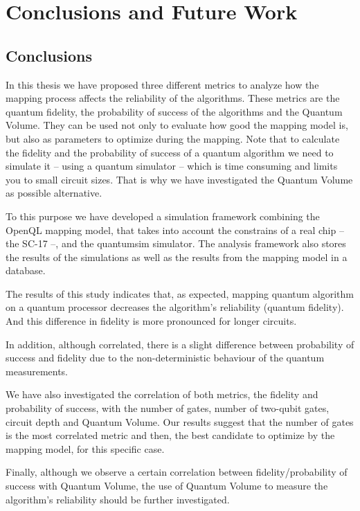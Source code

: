 

\chapter{Conclusions and Future Work}
\label{sec:org7d44186}
\section{Conclusions}
\label{sec:org16e6d2d}

In this thesis we have proposed three different metrics to analyze how the mapping process affects the reliability of the algorithms.
These metrics are the quantum fidelity, the probability of success of the algorithms and the Quantum Volume.
They can be used not only to evaluate how good the mapping model is, but also as parameters to optimize during the mapping.
Note that to calculate the fidelity and the probability of success of a quantum algorithm we need to simulate it -- using a quantum simulator -- which is time consuming and limits you to small circuit sizes.
That is why we have investigated the Quantum Volume as possible alternative.

To this purpose we have developed a simulation framework combining the OpenQL mapping model, that takes into account the constrains of a real chip -- the SC-17 --, and the quantumsim simulator.
The analysis framework also stores the results of the simulations as well as the results from the mapping model in a database.



The results of this study indicates that, as expected, mapping quantum algorithm on a quantum processor decreases the algorithm's reliability (quantum fidelity).
And this difference in fidelity is more pronounced for longer circuits.

In addition, although correlated, there is a slight difference between probability of success and fidelity due to the non-deterministic behaviour of the quantum measurements.

We have also investigated the correlation of both metrics, the fidelity and probability of success, with the number of gates, number of two-qubit gates, circuit depth and Quantum Volume.
Our results suggest that the number of gates is the most correlated metric and then, the best candidate to optimize by the mapping model, for this specific case.

Finally, although we observe a certain correlation between fidelity/probability of success with Quantum Volume, the use of Quantum Volume to measure the algorithm's reliability should be further investigated.


